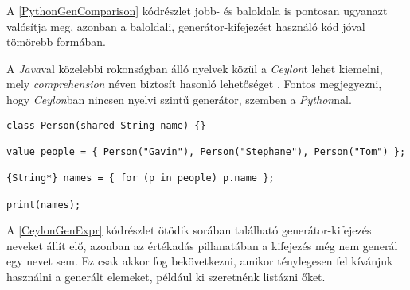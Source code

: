 A \ref{PythonGenComparison} kódrészlet jobb- és baloldala is pontosan ugyanazt valósítja meg, azonban a baloldali, generátor-kifejezést használó kód jóval tömörebb formában.

A \textit{Java}val közelebbi rokonságban álló nyelvek közül a \textit{Ceylon}t lehet kiemelni, mely \textit{comprehension} néven biztosít hasonló lehetőséget \cite{CeylonComprehension}. Fontos megjegyezni, hogy \textit{Ceylon}ban nincsen nyelvi szintű generátor, szemben a \textit{Python}nal.

\begin{lstlisting}[language=Ceylon, caption={Nevek kilistázása generátor-kifejezéssel Ceylonban}, captionpos=b, label=CeylonGenExpr]
class Person(shared String name) {}

value people = { Person("Gavin"), Person("Stephane"), Person("Tom") };
          
{String*} names = { for (p in people) p.name };
          
print(names);
\end{lstlisting}

A \ref{CeylonGenExpr} kódrészlet ötödik sorában található generátor-kifejezés neveket állít elő, azonban az értékadás pillanatában a kifejezés még nem generál egy nevet sem. Ez csak akkor fog bekövetkezni, amikor ténylegesen fel kívánjuk használni a generált elemeket, például ki szeretnénk listázni őket. 